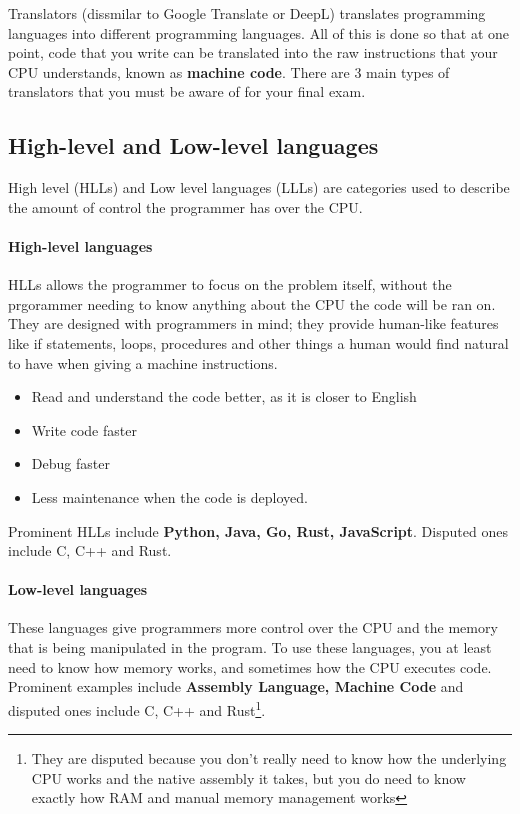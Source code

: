 \documentclass[../main.tex]{subfiles}
\begin{document}
Translators (dissmilar to Google Translate or DeepL) translates programming languages into different programming languages. All of this is done so that at one point, code that you write can be translated into the raw instructions that your CPU understands, known as \textbf{machine code}. There are 3 main types of translators that you must be aware of for your final exam.

\subsection{High-level and Low-level languages}

High level (HLLs) and Low level languages (LLLs) are categories used to describe the amount of control the programmer has over the CPU.

\paragraph{High-level languages}

HLLs allows the programmer to focus on the problem itself, without the prgorammer needing to know anything about the CPU the code will be ran on. They are designed with programmers in mind; they provide human-like features like if statements, loops, procedures and other things a human would find natural to have when giving a machine instructions. 

\begin{itemize}
    \item Read and understand the code better, as it is closer to English
    \item Write code faster
    \item Debug faster
    \item Less maintenance when the code is deployed.
\end{itemize}

Prominent HLLs include \textbf{Python, Java, Go, Rust, JavaScript}. Disputed ones include C, C++ and Rust.

\paragraph{Low-level languages}

These languages give programmers more control over the CPU and the memory that is being manipulated in the program. To use these languages, you at least need to know how memory works, and sometimes how the CPU executes code. Prominent examples include \textbf{Assembly Language, Machine Code} and disputed ones include C, C++ and Rust\footnote{They are disputed because you don't really need to know how the underlying CPU works and the native assembly it takes, but you do need to know exactly how RAM and manual memory management works}.
\end{document}
